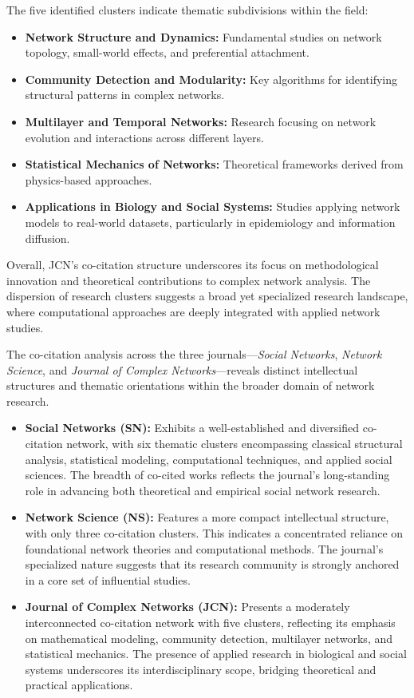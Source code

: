 \documentclass[twocolumn]{article}
\begin{document}
		The five identified clusters indicate thematic subdivisions within the field:
		\begin{itemize}
			\item \textbf{Network Structure and Dynamics:} Fundamental studies on network topology, small-world effects, and preferential attachment.
			\item \textbf{Community Detection and Modularity:} Key algorithms for identifying structural patterns in complex networks.
			\item \textbf{Multilayer and Temporal Networks:} Research focusing on network evolution and interactions across different layers.
			\item \textbf{Statistical Mechanics of Networks:} Theoretical frameworks derived from physics-based approaches.
			\item \textbf{Applications in Biology and Social Systems:} Studies applying network models to real-world datasets, particularly in epidemiology and information diffusion.
		\end{itemize}
		
		Overall, JCN’s co-citation structure underscores its focus on methodological innovation and theoretical contributions to complex network analysis. The dispersion of research clusters suggests a broad yet specialized research landscape, where computational approaches are deeply integrated with applied network studies.
		
		The co-citation analysis across the three journals—\textit{Social Networks}, \textit{Network Science}, and \textit{Journal of Complex Networks}—reveals distinct intellectual structures and thematic orientations within the broader domain of network research.
		
		\begin{itemize}
			\item \textbf{Social Networks (SN):} Exhibits a well-established and diversified co-citation network, with six thematic clusters encompassing classical structural analysis, statistical modeling, computational techniques, and applied social sciences. The breadth of co-cited works reflects the journal’s long-standing role in advancing both theoretical and empirical social network research.
			
			\item \textbf{Network Science (NS):} Features a more compact intellectual structure, with only three co-citation clusters. This indicates a concentrated reliance on foundational network theories and computational methods. The journal’s specialized nature suggests that its research community is strongly anchored in a core set of influential studies.
			
			\item \textbf{Journal of Complex Networks (JCN):} Presents a moderately interconnected co-citation network with five clusters, reflecting its emphasis on mathematical modeling, community detection, multilayer networks, and statistical mechanics. The presence of applied research in biological and social systems underscores its interdisciplinary scope, bridging theoretical and practical applications.
			
		\end{itemize}
		
\end{document}

